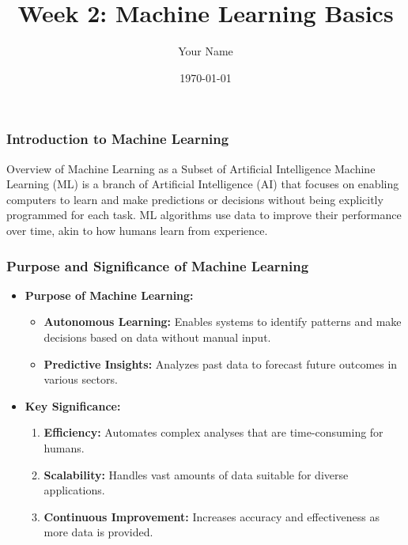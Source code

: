 \documentclass{beamer}
\title{Week 2: Machine Learning Basics}
\author{Your Name}
\institute{Your Institution}
\date{\today}
\begin{document}
\frame{\titlepage}

\begin{frame}[fragile]
    \frametitle{Introduction to Machine Learning}
    \begin{block}{Overview of Machine Learning as a Subset of Artificial Intelligence}
        Machine Learning (ML) is a branch of Artificial Intelligence (AI) that focuses on enabling computers to learn and make predictions or decisions 
        without being explicitly programmed for each task. ML algorithms use data to improve their performance over time, akin to how humans learn from experience.
    \end{block}
\end{frame}

\begin{frame}[fragile]
    \frametitle{Purpose and Significance of Machine Learning}
    \begin{itemize}
        \item \textbf{Purpose of Machine Learning:}
        \begin{itemize}
            \item \textbf{Autonomous Learning:} Enables systems to identify patterns and make decisions based on data without manual input.
            \item \textbf{Predictive Insights:} Analyzes past data to forecast future outcomes in various sectors.
        \end{itemize}
        
        \item \textbf{Key Significance:}
        \begin{enumerate}
            \item \textbf{Efficiency:} Automates complex analyses that are time-consuming for humans.
            \item \textbf{Scalability:} Handles vast amounts of data suitable for diverse applications.
            \item \textbf{Continuous Improvement:} Increases accuracy and effectiveness as more data is provided.
        \end{enumerate}
    \end{itemize}
\end{frame}
\end{document}
